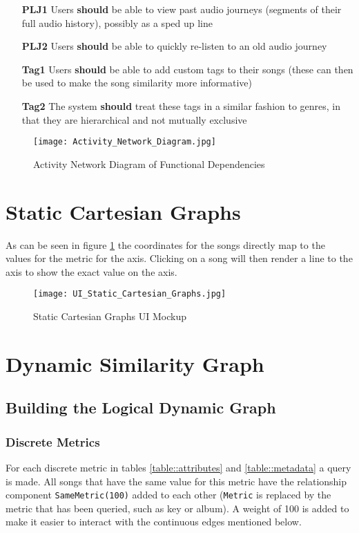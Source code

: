 \begin{itemize}
    \item[\textbf{PLJ1}] Users \textbf{should} be able to view past audio journeys (segments of their full audio history), possibly as a sped up line
    \item[\textbf{PLJ2}] Users \textbf{should} be able to quickly re-listen to an old audio journey
    \item[\textbf{Tag1}] Users \textbf{should} be able to add custom tags to their songs (these can then be used to make the song similarity more informative)
    \item[\textbf{Tag2}] The system \textbf{should} treat these tags in a similar fashion to genres, in that they are hierarchical and not mutually exclusive
\end{itemize}

\begin{figure}
    \texttt{[image: Activity\_Network\_Diagram.jpg]}
    \caption{Activity Network Diagram of Functional Dependencies}
\end{figure}


\section{Static Cartesian Graphs}
As can be seen in figure \ref{figure::ui::static_cartesian_graph} the coordinates for the songs directly map to the values for the metric for the axis. Clicking on a song will then render a line to the axis to show the exact value on the axis.
\begin{figure}
    \texttt{[image: UI\_Static\_Cartesian\_Graphs.jpg]}
    \caption{Static Cartesian Graphs UI Mockup}
    \label{figure::ui::static_cartesian_graph}
\end{figure}

\section{Dynamic Similarity Graph}
\subsection{Building the Logical Dynamic Graph}
\subsubsection{Discrete Metrics} For each discrete metric in tables \ref{table::attributes} and \ref{table::metadata} a query is made. All songs that have the same value for this metric have the relationship component \texttt{SameMetric(100)} added to each other (\texttt{Metric} is replaced by the metric that has been queried, such as key or album). A weight of 100 is added to make it easier to interact with the continuous edges mentioned below.

